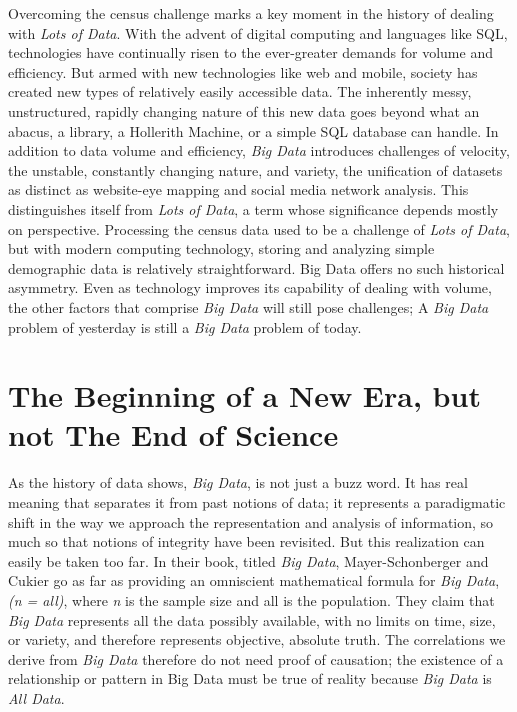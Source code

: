 \documentclass[sigconf]{acmart}
\begin{document}
	Overcoming the census challenge marks a key moment in the history of dealing with {\em Lots of Data}. With the advent of digital computing and languages like SQL, technologies have continually risen to the ever-greater demands for volume and efficiency.\cite{Rand} But armed with new technologies like web and mobile, society has created new types of relatively easily accessible data.\cite{Data_History} The inherently messy, unstructured, rapidly changing nature of this new data goes beyond what an abacus, a library, a Hollerith Machine, or a simple SQL database can handle. In addition to data volume and efficiency, {\em Big Data} introduces challenges of velocity, the unstable, constantly changing nature, and variety, the unification of datasets as distinct as website-eye mapping and social media network analysis.\cite{3Vs} This distinguishes itself from {\em Lots of Data}, a term whose significance depends mostly on perspective. Processing the census data used to be a challenge of {\em Lots of Data}, but with modern computing technology, storing and analyzing simple demographic data is relatively straightforward. Big Data offers no such historical asymmetry. Even as technology improves its capability of dealing with volume, the other factors that comprise {\em Big Data} will still pose challenges; A {\em Big Data} problem of yesterday is still a {\em Big Data} problem of today.

\section{The Beginning of a New Era, but not The End of Science}
As the history of data shows, {\em Big Data}, is not just a buzz word. It has real meaning that separates it from past notions of data; it represents a paradigmatic shift in the way we approach the representation and analysis of information, so much so that notions of integrity have been revisited. But this realization can easily be taken too far. In their book, titled {\em Big Data}, Mayer-Schonberger and Cukier go as far as providing an omniscient mathematical formula for {\em Big Data}, {\em (n = all)}, where {\em n} is the sample size and all is the population.  They claim that {\em Big Data} represents all the data possibly available, with no limits on time, size, or variety, and therefore represents objective, absolute truth. The correlations we derive from {\em Big Data} therefore do not need proof of causation; the existence of a relationship or pattern in Big Data must be true of reality because {\em Big Data} is {\em All Data}.\cite{Keystone}
\end{document}
